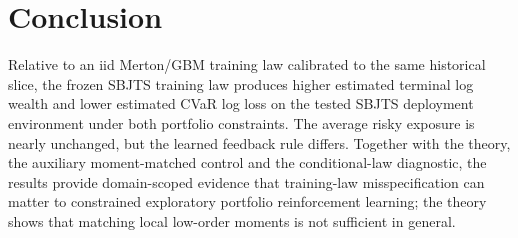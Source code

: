 \documentclass[11pt]{article}
\begin{document}
\section{Conclusion}
Relative to an iid Merton/GBM training law calibrated to the same historical slice, the frozen SBJTS training law produces higher estimated terminal log wealth and lower estimated CVaR log loss on the tested SBJTS deployment environment under both portfolio constraints. The average risky exposure is nearly unchanged, but the learned feedback rule differs. Together with the theory, the auxiliary moment-matched control and the conditional-law diagnostic, the results provide domain-scoped evidence that training-law misspecification can matter to constrained exploratory portfolio reinforcement learning; the theory shows that matching local low-order moments is not sufficient in general.
\end{document}

